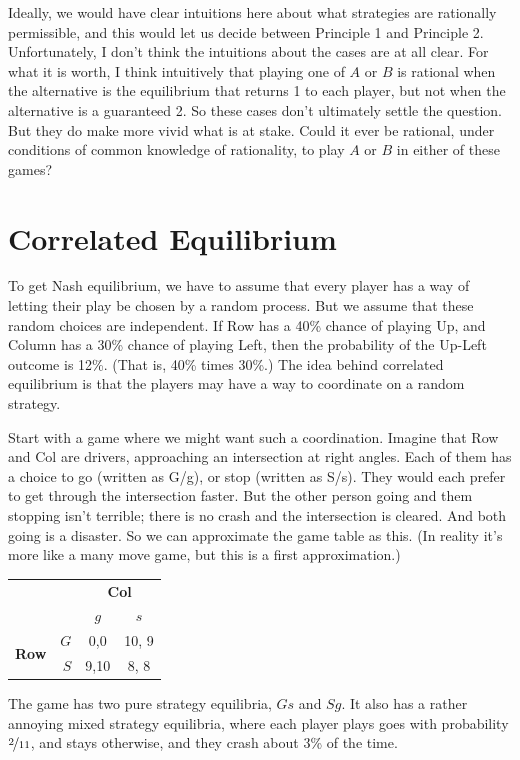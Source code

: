 \documentclass[openany]{book}
\begin{document}
Ideally, we would have clear intuitions here about what strategies are rationally permissible, and this would let us decide between Principle 1 and Principle 2. Unfortunately, I don't think the intuitions about the cases are at all clear. For what it is worth, I think intuitively that playing one of $A$ or $B$ is rational when the alternative is the equilibrium that returns 1 to each player, but not when the alternative is a guaranteed 2. So these cases don't ultimately settle the question. But they do make more vivid what is at stake. Could it ever be rational, under conditions of common knowledge of rationality, to play $A$ or $B$ in either of these games?

\section{Correlated Equilibrium}
To get Nash equilibrium, we have to assume that every player has a way of letting their play be chosen by a random process. But we assume that these random choices are independent. If Row has a 40\% chance of playing Up, and Column has a 30\% chance of playing Left, then the probability of the Up-Left outcome is 12\%. (That is, 40\% times 30\%.) The idea behind correlated equilibrium is that the players may have a way to coordinate on a random strategy.

Start with a game where we might want such a coordination. Imagine that Row and Col are drivers, approaching an intersection at right angles. Each of them has a choice to go (written as G/g), or stop (written as S/s). They would each prefer to get through the intersection faster. But the other person going and them stopping isn't terrible; there is no crash and the intersection is cleared. And both going is a disaster. So we can approximate the game table as this. (In reality it's more like a many move game, but this is a first approximation.)

\begin{center}
\begin{tabular}{l r | c c}
& & \multicolumn{2}{c}{\textbf{Col}} \\
& & $g$ & $s$  \\ \hline
\multirow{2}{*}{\textbf{Row}}
& $G$ & 0,0 & 10, 9 \\
& $S$ & 9,10 & 8, 8
\end{tabular}
\end{center}
The game has two pure strategy equilibria, $Gs$ and $Sg$. It also has a rather annoying mixed strategy equilibria, where each player plays goes with probability $\nicefrac{2}{11}$, and stays otherwise, and they crash about 3\% of the time. 
\end{document}
